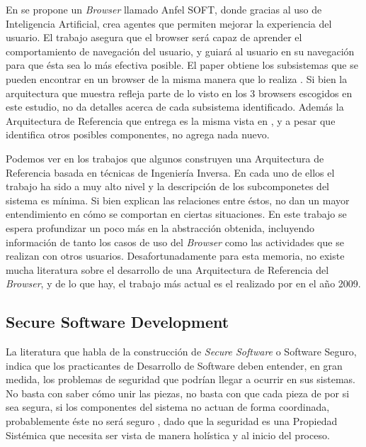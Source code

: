 \documentclass{sig-alternate-05-2015}
\begin{document}
  En \cite{Lwin2009} se propone un \textit{Browser} llamado Anfel SOFT, donde gracias al uso de Inteligencia Artificial, crea agentes que permiten mejorar la experiencia del usuario. El trabajo asegura que el browser será capaz de aprender el comportamiento de navegación del usuario, y guiará al usuario en su navegación para que ésta sea lo más efectiva posible. El paper obtiene los subsistemas que se pueden encontrar en un browser de la misma manera que lo realiza \cite{2005-grosskurth-browser-refarch}. Si bien la arquitectura que muestra refleja parte de lo visto en los 3 browsers escogidos en este estudio, no da detalles acerca de cada subsistema identificado. Además la Arquitectura de Referencia que entrega es la misma vista en \cite{2005-grosskurth-browser-refarch, preprint-grosskurth-browser-archevol}, y a pesar que identifica otros posibles componentes, no agrega nada nuevo.

  Podemos ver en los trabajos que algunos construyen una Arquitectura de Referencia basada en técnicas de Ingeniería Inversa. En cada uno de ellos el trabajo ha sido a muy alto nivel y la descripción de los subcomponetes del sistema es mínima. Si bien explican las relaciones entre éstos, no dan un mayor entendimiento en cómo se comportan en ciertas situaciones. En este trabajo se espera profundizar un poco más en la abstracción obtenida, incluyendo información de tanto los casos de uso del \textit{Browser} como las actividades que se realizan con otros usuarios. Desafortunadamente para esta memoria, no existe mucha literatura sobre el desarrollo de una Arquitectura de Referencia del \textit{Browser}, y de lo que hay, el trabajo más actual es el realizado por \cite{Lwin2009} en el año 2009.

  \subsection*{Secure Software Development}
  La literatura que habla de la construcción de \textit{Secure Software} o Software Seguro, indica que los practicantes de Desarrollo de Software deben entender, en gran medida, los problemas de seguridad que podrían llegar a ocurrir en sus sistemas. No basta con saber cómo unir las piezas, no basta con que cada pieza de por si sea segura, si los componentes del sistema no actuan de forma coordinada, probablemente éste no será seguro \cite{fernandez2013security}, dado que la seguridad es una Propiedad Sistémica que necesita ser vista de manera holística y al inicio del proceso.
\end{document}
